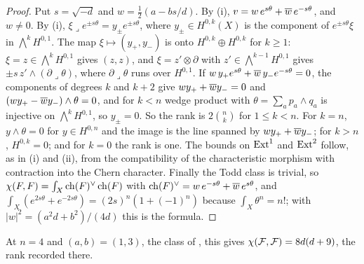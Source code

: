 \begin{proof}
Put $s=\sqrt{-d}$ and $w=\frac12(a-bs/d)$. By (i),
$v=w\,e^{s\theta}+\overline{w}\,e^{-s\theta}$, and $w\ne0$. By
(i), $\xi\lrcorner e^{\pm s\theta}=y_{\pm}e^{\pm s\theta}$,
where $y_{\pm}\in H^{0,k}(X)$ is the component of $e^{\pm s\theta}\xi$ in
$\bigwedge^{k}H^{0,1}$. The map $\xi\mapsto(y_{+},y_{-})$ is onto
$H^{0,k}\oplus H^{0,k}$ for $k\ge1$: $\xi=z\in\bigwedge^{k}H^{0,1}$ gives
$(z,z)$, and $\xi=z'\otimes\partial$ with $z'\in\bigwedge^{k-1}H^{0,1}$ gives
$\pm s\,z'\wedge(\partial\lrcorner\theta)$, where $\partial\lrcorner\theta$ runs
over $H^{0,1}$. If $w\,y_{+}e^{s\theta}+\overline{w}\,y_{-}e^{-s\theta}=0$, the
components of degrees $k$ and $k+2$ give $wy_{+}+\overline{w}y_{-}=0$ and
$(wy_{+}-\overline{w}y_{-})\wedge\theta=0$, and for $k<n$ wedge product with
$\theta=\sum_{a}p_{a}\wedge q_{a}$ is injective on $\bigwedge^{k}H^{0,1}$, so
$y_{\pm}=0$. So the rank is $2\binom{n}{k}$ for $1\le k<n$. For $k=n$,
$y\wedge\theta=0$ for $y\in H^{0,n}$ and the image is the line spanned by
$wy_{+}+\overline{w}y_{-}$; for $k>n$, $H^{0,k}=0$; and for $k=0$ the rank is one.
The bounds on $\operatorname{Ext}^{1}$ and $\operatorname{Ext}^{2}$ follow, as in (i)
and (ii), from the compatibility of the characteristic morphism with
contraction into the Chern character. Finally the Todd class
is trivial, so $\chi(F,F)=\int_{X}\operatorname{ch}(F)^{\vee}\operatorname{ch}(F)$ with
$\operatorname{ch}(F)^{\vee}=w\,e^{-s\theta}+\overline{w}\,e^{s\theta}$, and
$\int_{X}(e^{2s\theta}+e^{-2s\theta})=(2s)^{n}(1+(-1)^{n})$ because
$\int_{X}\theta^{n}=n!$; with $|w|^{2}=(a^{2}d+b^{2})/(4d)$ this is the
formula.
\end{proof}

At $n=4$ and $(a,b)=(1,3)$, the class of , this gives
$\chi(\mathcal{F},\mathcal{F})=8d(d+9)$, the rank recorded there.

